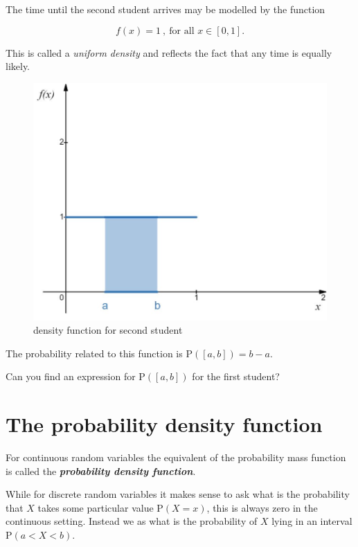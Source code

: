\documentclass[
]{book}
\theoremstyle{definition}
\theoremstyle{definition}
\theoremstyle{definition}
\theoremstyle{definition}
\theoremstyle{remark}
\begin{document}
The time until the second student arrives may be modelled by the function

\[f(x) = 1\ ,\ \text{for all } x\in[0,1].\]

This is called a \emph{uniform density} and reflects the fact that any time is equally likely.

\begin{figure}

{\centering \includegraphics[width=0.75\linewidth]{./figures/student2} 

}

\caption{density function for second student}\label{fig:student2}
\end{figure}

The probability related to this function is \(\text{P}([a,b]) = b-a\).

Can you find an expression for \(\text{P}([a,b])\) for the first student?

\hypertarget{the-probability-density-function}{%
\section{The probability density function}\label{the-probability-density-function}}

For continuous random variables the equivalent of the probability mass function is called the \textbf{\emph{probability density function}}.

While for discrete random variables it makes sense to ask what is the probability that \(X\) takes some particular value \(\text{P}(X=x)\), this is always zero in the continuous setting. Instead we as what is the probability of \(X\) lying in an interval \(\text{P}(a<X<b)\).
\end{document}
